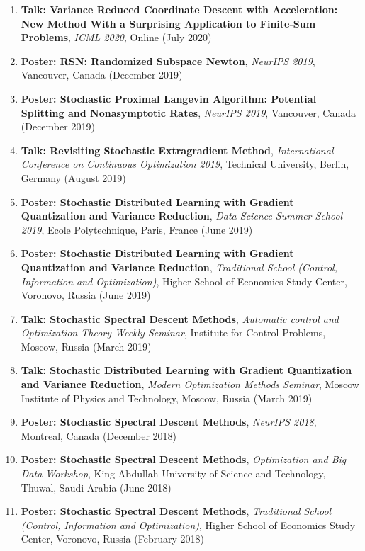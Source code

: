\begin{enumerate}
  \item {\bf Talk: Variance Reduced Coordinate Descent with Acceleration: New Method With a Surprising Application to Finite-Sum Problems}, {\em ICML 2020}, Online (July 2020)
  \item {\bf Poster: RSN: Randomized Subspace Newton}, {\em NeurIPS 2019}, Vancouver, Canada (December 2019)
  \item {\bf Poster: Stochastic Proximal Langevin Algorithm: Potential Splitting and Nonasymptotic Rates}, {\em NeurIPS 2019}, Vancouver, Canada (December 2019)
  \item {\bf Talk: Revisiting Stochastic Extragradient Method}, {\em International Conference on Continuous Optimization 2019}, Technical University, Berlin, Germany (August 2019)
  \item {\bf Poster: Stochastic Distributed Learning with Gradient Quantization and Variance Reduction}, {\em Data Science Summer School 2019}, Ecole Polytechnique, Paris, France (June 2019)
  \item {\bf Poster: Stochastic Distributed Learning with Gradient Quantization and Variance Reduction}, {\em Traditional School (Control, Information and Optimization)}, Higher School of Economics Study Center, Voronovo, Russia (June 2019)
  \item {\bf Talk: Stochastic Spectral Descent Methods}, {\em Automatic control and Optimization Theory Weekly Seminar}, Institute for Control Problems, Moscow, Russia (March 2019)
  \item {\bf Talk: Stochastic Distributed Learning with Gradient Quantization and Variance Reduction}, {\em Modern Optimization Methods Seminar}, Moscow Institute of Physics and Technology, Moscow, Russia (March 2019)
  \item {\bf Poster: Stochastic Spectral Descent Methods}, {\em NeurIPS 2018}, Montreal, Canada (December 2018)
  \item {\bf Poster: Stochastic Spectral Descent Methods}, {\em Optimization and Big Data Workshop}, King Abdullah University of Science and Technology, Thuwal, Saudi Arabia (June 2018)
  \item {\bf Poster: Stochastic Spectral Descent Methods}, {\em Traditional School (Control, Information and Optimization)}, Higher School of Economics Study Center, Voronovo, Russia (February 2018)
\end{enumerate}
